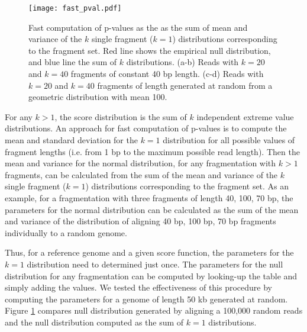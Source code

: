 \begin{figure}[t!]
\centering
\texttt{[image: fast\_pval.pdf]}
\caption[Fast computation of p-values]{
  Fast computation of p-values as the as the sum of mean and variance of
  the $k$ single fragment ($k=1$) distributions corresponding to the
  fragment set.
  Red line shows the empirical null distribution, and blue line the sum
  of $k$ distributions.
  (a-b) Reads with $k=20$ and $k=40$ fragments of constant 40 bp length.
  (c-d) Reads with $k=20$ and $k=40$ fragments of length generated at
  random from a geometric distribution with mean 100.}
\label{fast_pval}
\end{figure}

For any $k > 1$, the score distribution is the sum of $k$ independent
extreme value distributions. An approach for fast computation of
p-values is to compute the mean and standard deviation for the $k=1$
distribution for all possible values of fragment lengths (i.e. from 1 bp
to the maximum possible read length). Then the mean and variance for the
normal distribution, for any fragmentation with $k > 1$ fragments, can
be calculated from the sum of the mean and variance of the $k$ single
fragment ($k=1$) distributions corresponding to the fragment set.
%
As an example, for a fragmentation with three fragments of length 40,
100, 70 bp, the parameters for the normal distribution can be calculated
as the sum of the mean and variance of the distribution of aligning 40
bp, 100 bp, 70 bp fragments individually to a random genome.

Thus, for a reference genome and a given score function, the parameters
for the $k=1$ distribution need to determined just once. The parameters
for the null distribution for any fragmentation can be computed by
looking-up the table and simply adding the values.
%
We tested the effectiveness of this procedure by computing the
parameters for a genome of length 50 kb generated at random. Figure
\ref{fast_pval} compares null distribution generated by aligning a
100,000 random reads and the null distribution computed as the sum of
$k=1$ distributions.


